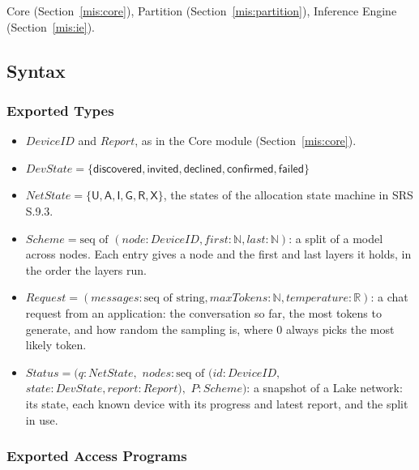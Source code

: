 \documentclass[12pt, titlepage]{article}
\begin{document}
Core (Section~\ref{mis:core}), Partition (Section~\ref{mis:partition}), Inference Engine
(Section~\ref{mis:ie}).

\subsection{Syntax}

\subsubsection{Exported Types}

\begin{itemize}
  \item $\mathit{DeviceID}$ and $\mathit{Report}$, as in the Core module
    (Section~\ref{mis:core}).
  \item $\mathit{DevState} = \{\mathsf{discovered}, \mathsf{invited},
    \mathsf{declined}, \mathsf{confirmed}, \mathsf{failed}\}$
  \item $\mathit{NetState} = \{\mathsf{U}, \mathsf{A}, \mathsf{I}, \mathsf{G},
    \mathsf{R}, \mathsf{X}\}$, the states of the allocation state machine in SRS
    S.9.3.
  \item $\mathit{Scheme} = \text{seq of } (\mathit{node}: \mathit{DeviceID},
    \mathit{first}: \mathbb{N}, \mathit{last}: \mathbb{N})$: a split of a model
    across nodes. Each entry gives a node and the first and last layers it
    holds, in the order the layers run.
  \item $\mathit{Request} = (\mathit{messages}: \text{seq of string},
    \mathit{maxTokens}: \mathbb{N}, \mathit{temperature}: \mathbb{R})$: a chat
    request from an application: the conversation so far,
    the most tokens to generate, and how random the sampling is, where 0 always
    picks the most likely token.
  \item $\mathit{Status} = (q: \mathit{NetState},$
    $\mathit{nodes}: \text{seq of } (\mathit{id}: \mathit{DeviceID},$
    $\mathit{state}: \mathit{DevState}, \mathit{report}: \mathit{Report}),$
    $P: \mathit{Scheme})$: a snapshot of a
    Lake network: its state, each known device with its progress and latest
    report, and the split in use.
\end{itemize}

\subsubsection{Exported Access Programs}
\end{document}
